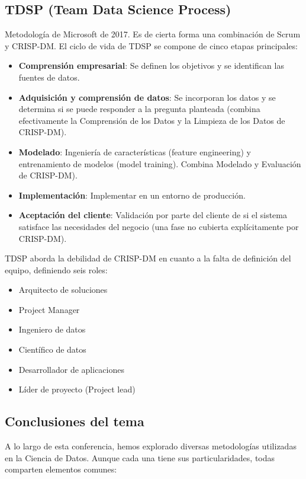 \documentclass[12pt]{book}
\begin{document}
\subsection{TDSP (Team Data Science Process)}
Metodología de Microsoft de 2017. Es de cierta forma una combinación de Scrum y CRISP-DM. El ciclo de vida de TDSP se compone de cinco etapas principales:
\begin{itemize}
    \item \textbf{Comprensión empresarial}: Se definen los objetivos y se identifican las fuentes de datos.
    \item \textbf{Adquisición y comprensión de datos}: Se incorporan los datos y se determina si se puede responder a la pregunta 
    planteada (combina efectivamente la Comprensión de los Datos y la Limpieza de los Datos de CRISP-DM).
    \item \textbf{Modelado}: Ingeniería de características (feature engineering) y entrenamiento de modelos (model training). Combina Modelado y Evaluación de CRISP-DM).
    \item \textbf{Implementación}: Implementar en un entorno de producción.
    \item \textbf{Aceptación del cliente}: Validación por parte del cliente de si el sistema satisface las necesidades del negocio (una fase no cubierta explícitamente por CRISP-DM).
\end{itemize}
TDSP aborda la debilidad de CRISP-DM en cuanto a la falta de definición del equipo, definiendo seis roles:
\begin{itemize}
    \item Arquitecto de soluciones
    \item Project Manager
    \item Ingeniero de datos
    \item Científico de datos
    \item Desarrollador de aplicaciones
    \item Líder de proyecto (Project lead)
\end{itemize}

\subsection{Conclusiones del tema}

A lo largo de esta conferencia, hemos explorado diversas metodologías utilizadas en la Ciencia de Datos. Aunque cada una tiene sus particularidades, todas comparten elementos comunes:
\end{document}
